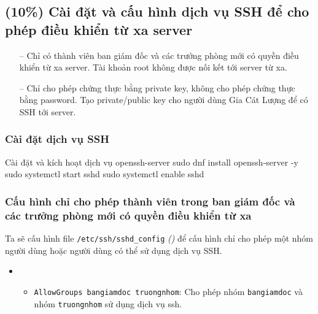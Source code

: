 \subsection{(10\%) Cài đặt và cấu hình dịch vụ SSH để cho phép điều khiển từ xa server}


\begin{itemize}
  \item [--] Chỉ có thành viên ban giám đốc và các trưởng phòng mới có quyền điều khiển từ xa server. Tài khoản root không được nối kết tới server từ xa.
  \item [--] Chỉ cho phép chứng thực bằng private key, không cho phép chứng thực bằng password. Tạo private/public key cho người dùng Gia Cát Lượng để có SSH tới server.
\end{itemize}

\subsubsection{Cài đặt dịch vụ SSH}


\vspace{0.5cm}
\begin{coding}{Cài đặt và kích hoạt dịch vụ openssh-server}
  sudo dnf install openssh-server -y
  sudo systemctl start sshd
  sudo systemctl enable sshd
\end{coding}

\subsubsection{Cấu hình chỉ cho phép thành viên trong ban giám đốc và các trưởng phòng mới có quyền điều khiển từ xa}

Ta sẽ cấu hình file \texttt{/etc/ssh/sshd\_config} \textit{()} để cấu hình chỉ cho phép một nhóm người dùng hoặc người dùng có thể sử dụng dịch vụ SSH.


\begin{itemize}[label={}]
  \item
        \begin{itemize}[label={--}]
          \item \texttt{AllowGroups bangiamdoc truongnhom}: Cho phép nhóm \texttt{bangiamdoc} và nhóm \texttt{truongnhom} sử dụng dịch vụ ssh.
        \end{itemize}
\end{itemize}

